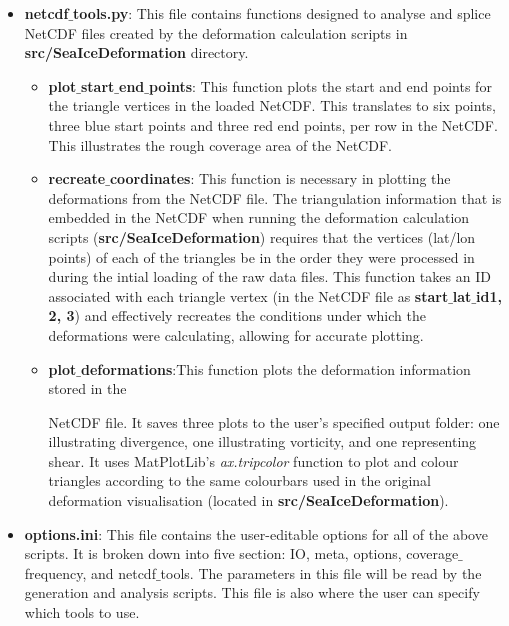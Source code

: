 \documentclass[12pt]{article}
\begin{document}
\begin{itemize}
    \item \textbf{netcdf$\_$tools.py}: This file contains functions designed to analyse and splice NetCDF files created by the deformation calculation scripts in \textbf{src/SeaIceDeformation} directory.
    
        \begin{itemize}
            \item \textbf{plot$\_$start$\_$end$\_$points}: This function plots the start and end points for the triangle vertices in the loaded NetCDF. This translates to six points, three blue start points and three red end points, per row in the NetCDF. This illustrates the rough coverage area of the NetCDF.
            
            \item \textbf{recreate$\_$coordinates}: This function is necessary in plotting the deformations from the NetCDF file. The triangulation information that is embedded in the NetCDF when running the deformation calculation scripts (\textbf{src/SeaIceDeformation}) requires that the vertices (lat/lon points) of each of the triangles be in the order they were processed in during the intial loading of the raw data files. This function takes an ID associated with each triangle vertex (in the NetCDF file as \textbf{start$\_$lat$\_$id1, 2, 3}) and effectively recreates the conditions under which the deformations were calculating, allowing for accurate plotting.
            
            \item \textbf{plot$\_$deformations}:This function  plots the deformation information stored in the 
            
            
            NetCDF file. It saves three plots to the user's specified output folder: one illustrating divergence, one illustrating vorticity, and one representing shear. It uses MatPlotLib's \textit{ax.tripcolor} function to plot and colour triangles according to the same colourbars used in the original deformation visualisation (located in \textbf{src/SeaIceDeformation}).
        
        \end{itemize}

    \item \textbf{options.ini}: This file contains the user-editable options for all of the above scripts. It is broken down into five section: IO, meta, options, coverage$\_$frequency, and netcdf$\_$tools. The parameters in this file will be read by the generation and analysis scripts. This file is also where the user can specify which tools to use.
\end{itemize}
\end{document}
